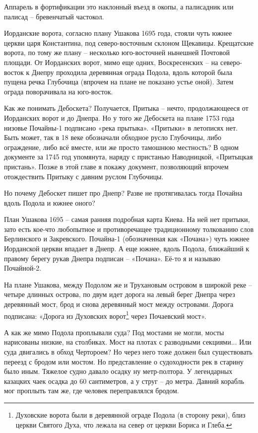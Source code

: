 Аппарель в фортификации это наклонный въезд в окопы, а палисадник или палисад – бревенчатый частокол.

Иорданские ворота, согласно плану Ушакова 1695 года, стояли чуть южнее церкви царя Константина, под северо-восточным склоном Щекавицы. Крещатские ворота, по тому же плану – несколько юго-восточней нынешней Почтовой площади. От Иорданских ворот, мимо еще одних, Воскресенских – на северо-восток к Днепру проходила деревянная ограда Подола, вдоль которой была пущена речка Глубочица (впрочем на плане не показано устье оной). Затем ограда поворачивала на юго-восток.

Как же понимать Дебоскета? Получается, Притыка – нечто, продолжающееся от Иорданских ворот и до Днепра. Но у того же Дебоскета на плане 1753 года низовье Почайны-1 подписано «река прытыка». «Притыки» в летописях нет. Быть может, так в 18 веке обозначали обходное русло Глубочицы, либо ограждение, либо всё вместе, или же просто тамошнюю местность? В одном документе за 1745 год упомянута, наряду с пристанью Наводницкой, «Притыцкая пристань». Позже в этой главе я покажу документ, позволяющий впрочем отождествить Притыку с давним руслом Глубочицы.

Но почему Дебоскет пишет про Днепр? Разве не протягивалась тогда Почайна вдоль Подола и южнее оного?
 
План Ушакова 1695 – самая ранняя подробная карта Киева. На ней нет притыки, зато есть кое-что любопытное и противоречащее традиционному толкованию слов Берлинского и Закревского. Почайна-1 (обозначенная как «Почана») чуть южнее Иорданской церкви впадает в Днепр. А еще южнее, вдоль Подола, ближайший к правому берегу рукав Днепра подписан – «Почана». Её-то я и называю Почайной-2. 

На плане Ушакова, между Подолом же и Трухановым островом в широкой реке – четыре длинных острова, по двум идет дорога на левый берег Днепра через деревянный мост, брод и снова деревянный мост между островами. Дорога подписана: «Дорога из Духовских ворот\footnote{Духовские ворота были в деревянной ограде Подола (в сторону реки), близ церкви Святого Духа, что лежала на север от церкви Бориса и Глеба.} через Почаевский мост».

А как же мимо Подола проплывали суда? Под мостами не могли, мосты нарисованы низкие, на столбиках. Мост на плотах с разводными секциями... Или суда двигались в обход Чертороем? Но через него тоже должен был существовать переезд с бродом или мостом. Но представление о судоходности рек в старину было иным. Тяжелое судно давало осадку ну метр-полтора. У легендарных казацких чаек осадка до 60 сантиметров, а у струг – до метра. Давний корабль мог проплыть там же, где человек переправлялся бродом.

